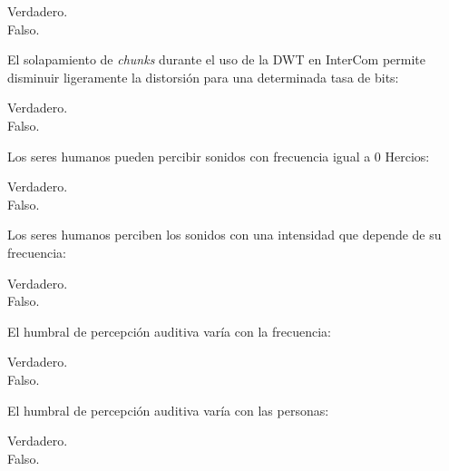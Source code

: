 \documentclass[legalpaper, 12pt, addpoints]{exam}
\begin{document}
\begin{questions}
\begin{oneparchoices}
  \choice Verdadero.\\
  \choice Falso.
\end{oneparchoices}
  
\vspace{0.10in}

\question El solapamiento de \emph{chunks} durante el uso de la DWT en
InterCom permite disminuir ligeramente la distorsión para una
determinada tasa de bits:

\begin{oneparchoices}
  \choice Verdadero.\\
  \choice Falso.
\end{oneparchoices}
  
\vspace{0.10in}

\question Los seres humanos pueden percibir sonidos con frecuencia
igual a 0 Hercios:

\begin{oneparchoices}
  \choice Verdadero.\\
  \choice Falso.
\end{oneparchoices}
  
\vspace{0.10in}

\question Los seres humanos perciben los sonidos con una intensidad
que depende de su frecuencia:

\begin{oneparchoices}
  \choice Verdadero.\\
  \choice Falso.
\end{oneparchoices}
  
\vspace{0.10in}

\question El humbral de percepción auditiva varía con la frecuencia:

\begin{oneparchoices}
  \choice Verdadero.\\
  \choice Falso.
\end{oneparchoices}
  
\vspace{0.10in}

\question El humbral de percepción auditiva varía con las personas:

\begin{oneparchoices}
  \choice Verdadero.\\
  \choice Falso.
\end{oneparchoices}
  

\end{questions}
\end{document}
